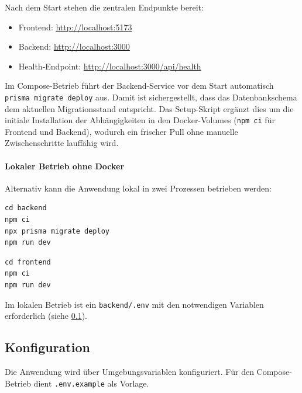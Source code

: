 Nach dem Start stehen die zentralen Endpunkte bereit:
\begin{itemize}
  \item Frontend: \url{http://localhost:5173}
  \item Backend: \url{http://localhost:3000}
  \item Health-Endpoint: \url{http://localhost:3000/api/health}
\end{itemize}

Im Compose-Betrieb führt der Backend-Service vor dem Start automatisch
\texttt{prisma migrate deploy} aus.
Damit ist sichergestellt, dass das Datenbankschema dem aktuellen
Migrationsstand entspricht.
Das Setup-Skript ergänzt dies um die initiale Installation der Abhängigkeiten in
den Docker-Volumes (\texttt{npm ci} für Frontend und Backend), wodurch ein
frischer Pull ohne manuelle Zwischenschritte lauffähig wird.

\paragraph{Lokaler Betrieb ohne Docker}
Alternativ kann die Anwendung lokal in zwei Prozessen betrieben werden:

\begin{lstlisting}[style=terminal,caption={Backend lokal starten}]
cd backend
npm ci
npx prisma migrate deploy
npm run dev
\end{lstlisting}

\begin{lstlisting}[style=terminal,caption={Frontend lokal starten (zweites Terminal)}]
cd frontend
npm ci
npm run dev
\end{lstlisting}

Im lokalen Betrieb ist ein \texttt{backend/.env} mit den notwendigen Variablen
erforderlich (siehe \cref{subsec:betrieb-konfiguration}).

\subsection{Konfiguration}
\label{subsec:betrieb-konfiguration}

Die Anwendung wird über Umgebungsvariablen konfiguriert.
Für den Compose-Betrieb dient \texttt{.env.example} als Vorlage.

